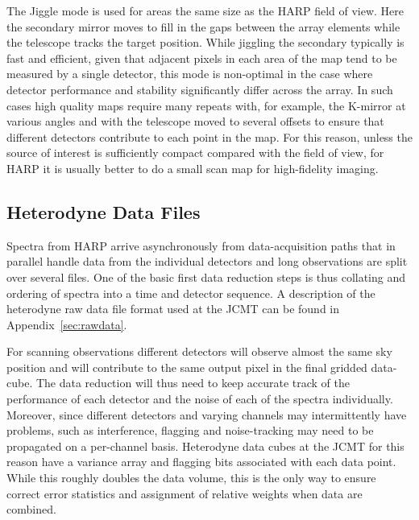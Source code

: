\documentclass[a4paper,fleqn,usenatbib]{mnras}
\begin{document}
The Jiggle mode is used for areas the same size as the HARP field of
view. Here the secondary mirror moves to fill in the gaps between the
array elements while the telescope tracks the target position.  While
jiggling the secondary typically is fast and efficient, given that
adjacent pixels in each area of the map tend to be measured by a
single detector, this mode is non-optimal in the case where detector
performance and stability significantly differ across the array. In
such cases high quality maps require many repeats with, for example,
the K-mirror at various angles and with the telescope moved to several
offsets to ensure that different detectors contribute to each point in
the map. For this reason, unless the source of interest is
sufficiently compact compared with the field of view, for HARP it is
usually better to do a small scan map for high-fidelity imaging.


\subsection{Heterodyne Data Files}
\label{sec:format}

Spectra from HARP arrive asynchronously from data-acquisition paths
that in parallel handle data from the individual detectors and long
observations are split over several files. One of the basic first data
reduction steps is thus collating and ordering of spectra into a time
and detector sequence.  A description of the heterodyne raw data file
format used at the JCMT can be found in Appendix~\ref{sec:rawdata}.

For scanning observations different detectors will observe almost
the same sky position and will contribute to the same output pixel in
the final gridded data-cube. The data reduction will thus need to keep
accurate track of the performance of each detector and the noise of
each of the spectra individually. Moreover, since different detectors
and varying channels may intermittently have problems, such as
interference, flagging and noise-tracking may need to be propagated on a
per-channel basis. Heterodyne data cubes at the JCMT for this reason
have a variance array and flagging bits associated with each data point.
While this roughly doubles the data volume, this is the only way to
ensure correct error statistics and assignment of relative weights
when data are combined.
\end{document}
